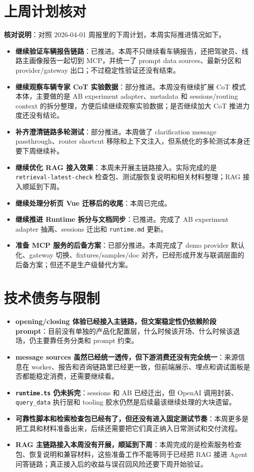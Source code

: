 \documentclass[UTF8]{ctexart}
\begin{document}
\section{上周计划核对}

\textbf{核对说明}：对照 2026-04-01 周报里的下周计划，本周实际推进情况如下。

\begin{itemize}
\item \textbf{继续验证车辆报告链路}：已推进。本周不只继续看车辆报告，还把驾驶员、线路主画像报告一起切到 MCP，并统一了 prompt data sources、最新分区和 provider/gateway 出口；不过稳定性验证还没有结束。
\item \textbf{继续观察车辆专家 CoT 实验数据}：部分推进。本周没有继续扩展 CoT 模式本体，主要做的是 AB experiment adapter、metadata 和 sessions/routing context 的拆分整理，方便后续继续观察实验数据；是否继续加大 CoT 推进力度还没有结论。
\item \textbf{补齐澄清链路多轮测试}：部分推进。本周做了 clarification message passthrough、router shortcut 移除和上下文注入，但系统化的多轮测试本身还要下周继续补。
\item \textbf{继续优化 RAG 接入效果}：本周未开展主链路接入。实际完成的是 \texttt{retrieval-latest-check} 检查包、测试服恢复说明和相关材料整理；RAG 接入顺延到下周。
\item \textbf{继续处理分析页 Vue 迁移后的收尾}：本周已完成。
\item \textbf{继续推进 Runtime 拆分与文档同步}：已推进。完成了 AB experiment adapter 抽离、sessions 迁出和 \texttt{runtime.md} 更新。
\item \textbf{准备 MCP 服务的后备方案}：已部分推进。本周完成了 demo provider 默认化、gateway 切换、fixtures/samples/doc 对齐，已经形成开发与联调层面的后备方案；但还不是生产级替代方案。
\end{itemize}

\section{技术债务与限制}

\begin{itemize}
\item \textbf{opening/closing 体验已经接入主链路，但文案稳定性仍依赖阶段 prompt}：目前没有单独的产品化配置层，什么时候该开场、什么时候该退场，仍主要靠任务分类和 prompt 约束。
\item \textbf{message sources 虽然已经统一透传，但下游消费还没有完全统一}：来源信息在 worker、报告和咨询链路里已经更一致，但前端展示、埋点和调试面板是否都能稳定消费，还需要继续看。
\item \textbf{\texttt{runtime.ts} 仍未拆完}：sessions 和 AB 已经迁出，但 OpenAI 调用封装、\texttt{query\_data} 执行层和 tooling 胶水仍然是后续最该继续处理的大块遗留。
\item \textbf{可靠性脚本和检索检查包已经有了，但还没有进入固定测试节奏}：本周更多是把工具和材料准备出来，后续还需要把它们真正纳入日常测试和交付流程。
\item \textbf{RAG 主链路接入本周没有开展，顺延到下周}：本周完成的是检索服务检查包、恢复说明和兼容材料，这些准备工作不能等同于已经把 RAG 接进 Agent 问答链路；真正接入后的收益与误召回风险还要下周开始验证。
\end{itemize}
\end{document}
